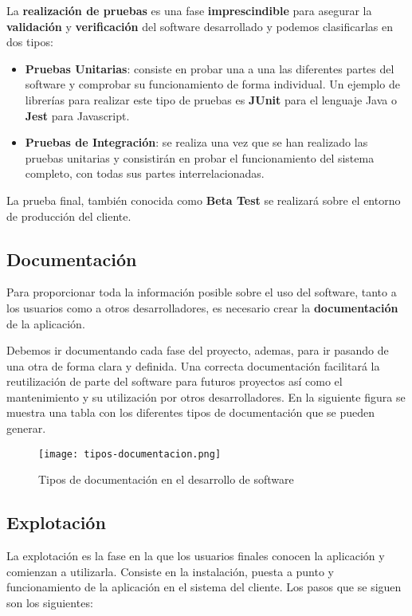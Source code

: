 La \textbf{realización de pruebas} es una fase \textbf{imprescindible} para asegurar la \textbf{validación} y \textbf{verificación} del software desarrollado y podemos clasificarlas en dos tipos:

\begin{itemize}
    \item \textbf{Pruebas Unitarias}: consiste en probar una a una las diferentes partes del software y comprobar su funcionamiento de forma individual. Un ejemplo de librerías para realizar este tipo de pruebas es \textbf{JUnit} para el lenguaje Java o \textbf{Jest} para Javascript.
    \item \textbf{Pruebas de Integración}: se realiza una vez que se han realizado las pruebas unitarias y consistirán en probar el funcionamiento del sistema completo, con todas sus partes interrelacionadas.
\end{itemize}

La prueba final, también conocida como \textbf{Beta Test} se realizará sobre el entorno de producción del cliente.

\subsection{Documentación}
Para proporcionar toda la información posible sobre el uso del software, tanto a los usuarios como a otros desarrolladores, es necesario crear la \textbf{documentación} de la aplicación.

Debemos ir documentando cada fase del proyecto, ademas, para ir pasando de una otra de forma clara y definida. Una correcta documentación facilitará la reutilización de parte del software para futuros proyectos así como el mantenimiento y su utilización por otros desarrolladores. En la siguiente figura se muestra una tabla con los diferentes tipos de documentación que se pueden generar.

\begin{figure}[ht]
    \centering
    \texttt{[image: tipos-documentacion.png]}
    \caption{Tipos de documentación en el desarrollo de software}
\end{figure}

\subsection{Explotación}
La explotación es la fase en la que los usuarios finales conocen la aplicación y comienzan a utilizarla. Consiste en la instalación, puesta a punto y funcionamiento de la aplicación en el sistema del cliente. Los pasos que se siguen son los siguientes:

